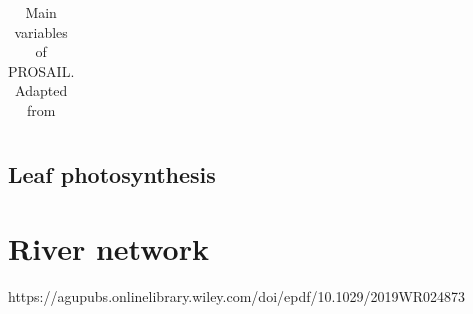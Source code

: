 \documentclass{article}
\begin{document}
\begin{table}[]
{\begin{tabular}{llllll}
\hline
\end{tabular}%
}
\caption{Main variables of PROSAIL. Adapted from \citet{Jacquemoud2009,Yang2017}}
\label{tab:prosail}
\end{table}

\subsection{Leaf photosynthesis}







\section{River network}
https://agupubs.onlinelibrary.wiley.com/doi/epdf/10.1029/2019WR024873



\end{document}
